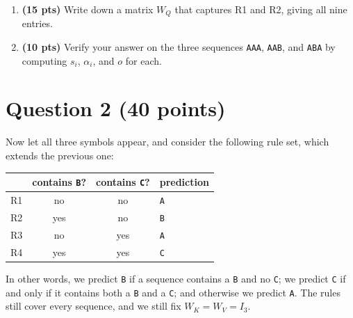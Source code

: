 \documentclass[11pt]{article}
\newcommand{\wrd}[1]{\texttt{#1}}
\newcommand{\Wq}{\ensuremath{W_Q}}
\newcommand{\Wk}{\ensuremath{W_K}}
\newcommand{\Wv}{\ensuremath{W_V}}
\begin{document}
\begin{enumerate}[label=(\alph*)]

  \item \textbf{(15 pts)} Write down a matrix $\Wq$ that captures R1 and R2, giving all nine entries.

  \item \textbf{(10 pts)} Verify your answer on the three sequences \wrd{AAA}, \wrd{AAB}, and \wrd{ABA} by
  computing $s_i$, $\alpha_i$, and $o$ for each.



\end{enumerate}

\section{Question 2 (40 points)}

Now let all three symbols appear, and consider the following rule set, which extends the previous one:
\begin{center}
\begin{tabular}{lccl}
\toprule
& contains \wrd{B}? & contains \wrd{C}? & prediction\\
\midrule
R1 & no  & no  & \wrd{A}\\
R2 & yes & no  & \wrd{B}\\
R3 & no  & yes & \wrd{A}\\
R4 & yes & yes & \wrd{C}\\
\bottomrule
\end{tabular}
\end{center}
In other words, we predict \wrd{B} if a sequence contains a \wrd{B} and no \wrd{C}; we predict \wrd{C} if and
only if it contains both a \wrd{B} and a \wrd{C}; and otherwise we predict \wrd{A}.
The rules still cover every sequence, and we still fix $\Wk = \Wv = I_3$.
\end{document}
